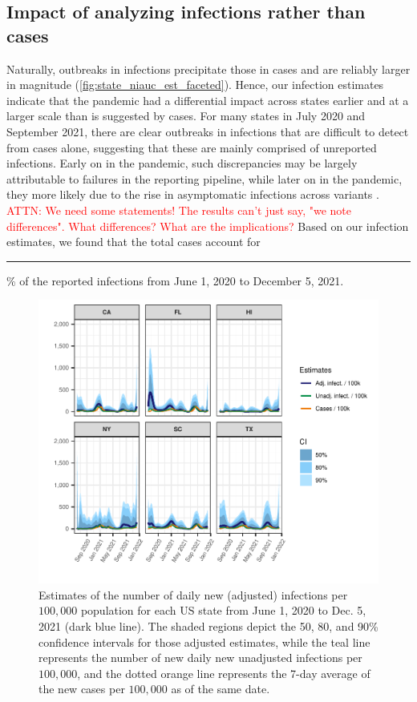 \documentclass{article}
\newcommand{\attn }[1]{\textcolor{red}{ATTN: #1}}
\begin{document}
\subsection{Impact of analyzing infections rather than cases}
Naturally, outbreaks in infections precipitate those in cases and are reliably larger in
magnitude (\autoref{fig:state_niauc_est_faceted}). Hence, our infection estimates indicate
that the pandemic had a differential impact across states earlier and at a larger scale
than is suggested by cases. For many states in July 2020 and September 2021, there are
clear outbreaks in infections that are difficult to detect from cases alone, suggesting
that these are mainly comprised of unreported infections. Early on in the pandemic, such
discrepancies may be largely attributable to failures in the reporting pipeline, while
later on in the pandemic, they more likely due to the rise in asymptomatic infections
across variants \citep{oph2022covid, garrett2022high}.
\attn {We need some statements! The results can't just say, "we note
differences". What differences? What are the implications?}
Based on our infection estimates, we found that the total cases account for
\rule{1cm}{0.15mm}\% of the reported infections from June 1, 2020 to December 5, 2021.

\begin{figure}[!tb]
\centering
    \includegraphics[width=.99\textwidth]{state_niauc_est_faceted.pdf} %
    \caption{Estimates of the number of daily new (adjusted) infections per
     $100,000$ population for each US state from June 1, 2020 to Dec. 5, 2021
      (dark blue line). The shaded regions depict the 50, 80, and 90\% confidence 
      intervals for those adjusted estimates, while the teal line represents the 
      number of new daily new unadjusted infections per $100,000$, and the dotted 
      orange line represents the 7-day average of the new cases per $100,000$ as 
      of the same date.}
    \label{fig:state_niauc_est_faceted}
\end{figure}
\end{document}

